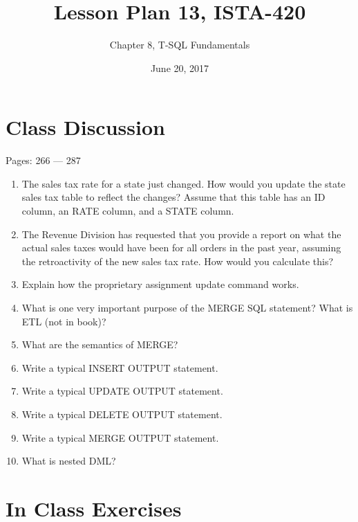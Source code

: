 \documentclass{article}
\title{Lesson Plan 13, ISTA-420}
\author{Chapter 8, T-SQL Fundamentals}
\date{June 20, 2017}
\begin{document}
    

    \maketitle{}

    \section{Class Discussion}

    Pages: 266 --- 287

    \begin{enumerate}
        \item The sales tax rate for a state just changed. How would you update the state sales tax table to reflect the changes? Assume that this table has an ID column, an RATE column, and a STATE column.
        \item The Revenue Division has requested that you provide a report on what the actual sales taxes would have been for all orders in the past year, assuming the retroactivity of the new sales tax rate. How would you calculate this?
        \item Explain how the proprietary assignment update command works.
        \item What is one very important purpose of the MERGE SQL statement? What is ETL (not in book)?
        \item What are the semantics of MERGE?
        \item Write a typical INSERT OUTPUT statement.
        \item Write a typical UPDATE OUTPUT statement.
        \item Write a typical DELETE OUTPUT statement.
        \item Write a typical MERGE OUTPUT statement.
        \item What is nested DML?
    \end{enumerate}

    \section{In Class Exercises}
\end{document}
